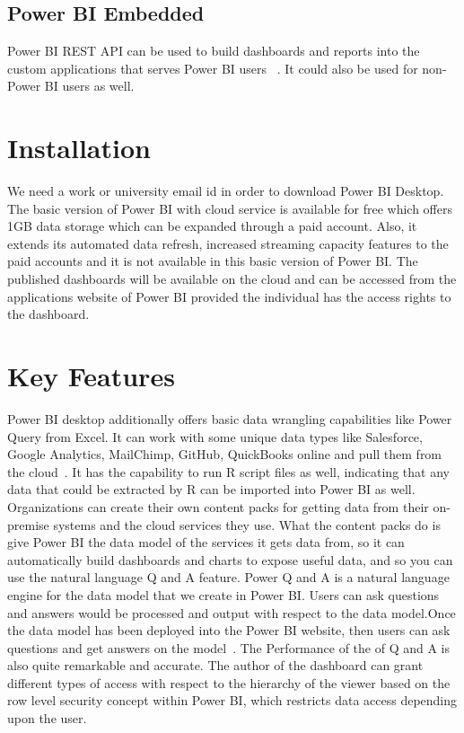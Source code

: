\subsection{Power BI Embedded}
Power BI REST API can be used to build dashboards and 
reports into the custom applications that serves Power BI users
~\cite{hid-sp18-418-powerbi-components}. It could also be used for non-Power 
BI users as well.

\section{Installation}
We need a work or university email id in order to download Power BI Desktop. The basic 
version of Power BI with cloud service is available for free which offers 
1GB data storage which can be expanded through a paid account. Also, it extends
its automated data refresh, increased streaming capacity features to the paid 
accounts and it is not available in this basic version of Power BI. 
The published dashboards will be available on the cloud and can be accessed from 
the applications website of Power BI provided the individual has the access rights to the 
dashboard.
 
\section{Key Features}
Power BI desktop additionally offers basic data wrangling capabilities like Power Query 
from Excel. It can work with some unique data types like Salesforce, Google Analytics, 
MailChimp, GitHub, QuickBooks online and pull them from the cloud~\cite{hid-sp18-418-powerbi-intro}.
It has the capability to run R script files as well, indicating that any data 
that could be extracted by R can be imported into Power BI as well. 
Organizations can create their own content packs for getting data from their 
on-premise systems and the cloud services they use. What the content packs do 
is give Power BI the data model of the services it gets data from, so it can 
automatically build dashboards and charts to expose useful data, and so you 
can use the natural language Q and A feature. Power Q and A  is a natural language 
engine for the data model that we create in Power BI. Users can ask questions 
and answers would be processed and output with respect to the data model.Once 
the data model has been deployed into the Power BI website, then users can ask 
questions and get answers on the model~\cite{hid-sp18-418-powerbi-intro}. The 
Performance of the of Q and A is also quite remarkable and accurate.
The author of the dashboard can grant different types of access with respect 
to the hierarchy of the viewer based on the row level security concept within 
Power BI, which restricts data access depending upon the user.

